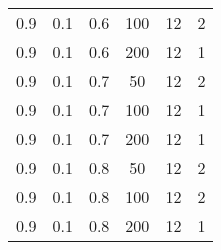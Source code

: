 \begin{table}[h]
\begin{center}
\begin{tabular}{|c|c|c|c|c|c|}
	0.9 &  0.1 &  0.6 &  100 &    12 &     2 \\
	0.9 &  0.1 &  0.6 &  200 &    12 &     1 \\
   \hline
	0.9 &  0.1 &  0.7 &   50 &    12 &     2 \\
	0.9 &  0.1 &  0.7 &  100 &    12 &     1 \\
	0.9 &  0.1 &  0.7 &  200 &    12 &     1 \\
   \hline
	0.9 &  0.1 &  0.8 &   50 &    12 &     2 \\
	0.9 &  0.1 &  0.8 &  100 &    12 &     2 \\
	0.9 &  0.1 &  0.8 &  200 &    12 &     1 \\
   \hline
		\end{tabular}
	\end{center}
\end{table}